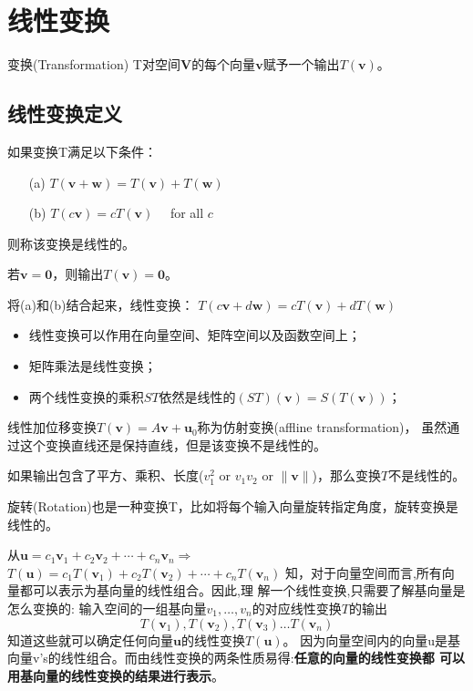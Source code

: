 \section{线性变换}
变换(Transformation) T对空间$\bm{V}$的每个向量$\bm{v}$赋予一个输出$T(\bm{v})$。

\subsection{线性变换定义}
如果变换T满足以下条件：
\begin{itemize}
    \item[(a)] $T(\boldsymbol{v}+\boldsymbol{w})=T(\boldsymbol{v})+T(\boldsymbol{w})$
    \item[(b)] $T(c \boldsymbol{v})=c T(\boldsymbol{v}) \quad$ for all $c$
\end{itemize}
则称该变换是线性的。

若$\bm{v}=\bm{0}$，则输出$T(\bm{v}) = \bm{0}$。

将(a)和(b)结合起来，线性变换：
$T(c \boldsymbol{v}+d \boldsymbol{w}) = c T(\boldsymbol{v})+d T(\boldsymbol{w})$

\begin{itemize}
    \item 线性变换可以作用在向量空间、矩阵空间以及函数空间上；
    \item 矩阵乘法是线性变换；
    \item 两个线性变换的乘积$ST$依然是线性的$(S T)(\boldsymbol{v})=S(T(\boldsymbol{v}))$；
\end{itemize}

线性加位移变换$T(\boldsymbol{v})=A \boldsymbol{v}+\boldsymbol{u}_{0}$称为仿射变换(affline transformation)，
虽然通过这个变换直线还是保持直线，但是该变换不是线性的。

如果输出包含了平方、乘积、长度($v_{1}^{2}$ or $v_{1} v_{2}$ or $\|\boldsymbol{v}\|$)，那么变换$T$不是线性的。

旋转(Rotation)也是一种变换T，比如将每个输入向量旋转指定角度，旋转变换是线性的。

从$\bm{u}=c_{1} \bm{v}_{1}+c_{2} \bm{v}_{2}+\cdots+c_{n} \bm{v}_{n} \Rightarrow$
$T(\boldsymbol{u})=c_{1} T\left(\boldsymbol{v}_{1}\right)+c_{2} T\left(\boldsymbol{v}_{2}\right)+\cdots+c_{n} T\left(\boldsymbol{v}_{n}\right)$
知，对于向量空间而言,所有向量都可以表示为基向量的线性组合。因此,理
解一个线性变换,只需要了解基向量是怎么变换的:
输入空间的一组基向量$v_{1}, \ldots, v_{n}$的对应线性变换$T$的输出
$$T\left(\bm{v}_{1}\right) , T\left(\bm{v}_{2}\right), T\left(\bm{v}_{3}\right) \ldots T\left(\bm{v}_{n}\right)$$
知道这些就可以确定任何向量$\bm{u}$的线性变换$T(\bm{u})$。
因为向量空间内的向量u是基向量v's的线性组合。而由线性变换的两条性质易得:\textbf{任意的向量的线性变换都
可以用基向量的线性变换的结果进行表示}。

